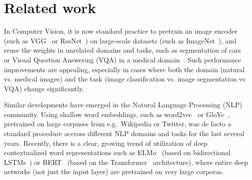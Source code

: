 \section{Related work}
\label{sec:related_work}

In Computer Vision, it is now standard practice to pretrain an image encoder (such as VGG~\cite{simonyan2014very} or ResNet~\cite{he2016deep}) on large-scale datasets (such as ImageNet~\cite{deng2009imagenet}), and reuse the weights in unrelated domains and tasks, such as segmentation of cars~\cite{iglovikov2018ternausnet} or Visual Question Answering (VQA) in a medical domain~\cite{kornuta2019leveraging}.
Such performance improvements are appealing, especially in cases where both the domain (natural vs. medical images) and the task (image classification vs. image segmentation vs VQA) change significantly.

Similar developments have emerged in the Natural Language Processing (NLP) community.
Using shallow word embeddings, such as word2vec~\cite{mikolov2013distributed} or GloVe~\cite{pennington2014glove}, pretrained on large corpuses from e.g.\ Wikipedia or Twitter, was de facto a standard procedure accross different NLP domains and tasks for the last several years.
Recently, there is a clear, growing trend of utilization of deep contextualized word representations such as ELMo~\cite{peters2018deep} (based on bidirectional LSTMs~\cite{hochreiter1997long}) or BERT~\cite{devlin2018bert} (based on the Transformer~\cite{vaswani2017attention} architecture), where entire deep networks (not just the input layer) are pretrained on very large corporas.

